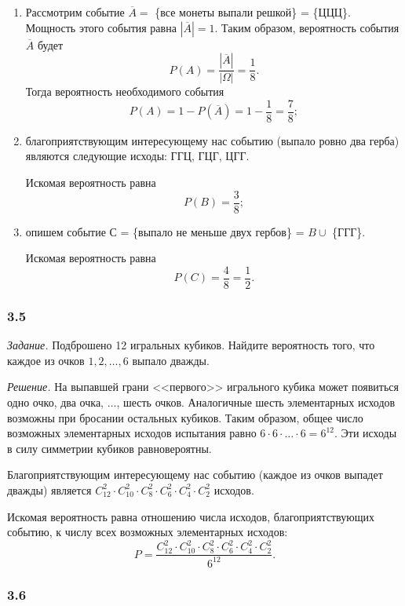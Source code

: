 \begin{enumerate}[label=\alph*)]
\item Рассмотрим событие $ \overline{A} = $ \{все монеты выпали решкой\} = \{ЦЦЦ\}.
Мощность этого события равна $\left| \overline{A} \right| = 1$.
Таким образом, вероятность события $ \overline{A} $ будет
$$P \left( A \right) =
\frac{ \left| \overline{A} \right| }{ \left| \Omega \right| } =
\frac{1}{8}.$$
Тогда вероятность необходимого события
$$P \left( A \right) =
1 - P \left( \overline{A} \right) =
1 - \frac{1}{8} =
\frac{7}{8};$$
\item благоприятствующим интересующему нас событию (выпало ровно два герба) являются следующие исходы: ГГЦ, ГЦГ, ЦГГ.

Искомая вероятность равна
$$P \left( B \right) =
\frac{3}{8};$$

\item опишем событие С = \{выпало не меньше двух гербов\} = $B \cup $ \{ГГГ\}.

Искомая вероятность равна
$$P \left( C \right) =
\frac{4}{8} =
\frac{1}{2}.$$
\end{enumerate}

\subsubsection*{3.5}

\textit{Задание.} Подброшено 12 игральных кубиков.
Найдите вероятность того, что каждое из очков $1, 2, \dotsc, 6$ выпало дважды.

\textit{Решение.}
На выпавшей грани <<первого>> игрального кубика может появиться одно очко, два очка, $ \dotsc $, шесть очков.
Аналогичные шесть элементарных исходов возможны при бросании остальных кубиков.
Таким образом, общее число возможных элементарных исходов испытания равно $6 \cdot 6 \cdot \dotsc \cdot 6 = 6^{12}$.
Эти исходы в силу симметрии кубиков равновероятны.

Благоприятствующим интересующему нас событию
(каждое из очков выпадет дважды)
является $C_{12}^2 \cdot C_{10}^2 \cdot C_8^2 \cdot C_6^2 \cdot C_4^2 \cdot C_2^2$ исходов.

Искомая вероятность равна отношению числа исходов, благоприятствующих событию,
к числу всех возможных элементарных исходов:
$$P =
\frac{C_{12}^2 \cdot C_{10}^2 \cdot C_8^2 \cdot C_6^2 \cdot C_4^2 \cdot C_2^2}{6^{12}}.$$

\subsubsection*{3.6}

